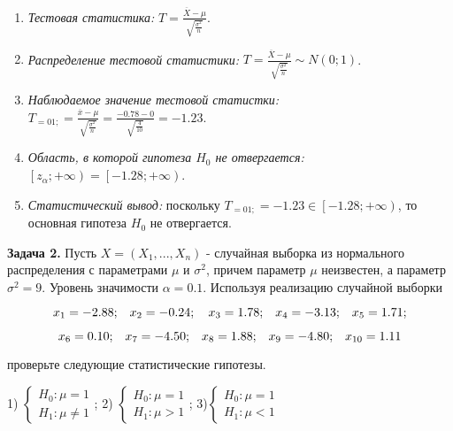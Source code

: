 \begin{enumerate}
\item  \textit{Тестовая статистика:} $T=\frac{\overline{X}-\mu }{\sqrt{{\tfrac{\sigma ^{2} }{n}} } } $.

\item  \textit{Распределение тестовой статистики:} $T=\frac{\overline{X}-\mu }{\sqrt{{\tfrac{\sigma ^{2} }{n}} } } \sim N\left(0;1\right)$.

\item  \textit{Наблюдаемое значение тестовой статистки:} $T_{=01;} =\frac{\overline{x}-\mu }{\sqrt{{\tfrac{\sigma ^{2} }{n}} } } =\frac{-0.78-0}{\sqrt{{\tfrac{4}{10}} } } =-1.23$.

\item  \textit{Область, в которой гипотеза $H_{0} $ не отвергается:} $\left[z_{\alpha } ;+\infty \right)=\left[-1.28;+\infty \right)$.

\item  \textit{Статистический вывод:} поскольку $T_{=01;} =-1.23\in \left[-1.28;+\infty \right)$, то основная гипотеза $H_{0} $ не отвергается.
\end{enumerate}



\textbf{Задача 2. }Пусть $X=\left(X_{1} ,...,X_{n} \right)$ - случайная выборка из нормального распределения с параметрами $\mu $ и $\sigma ^{2} $, причем параметр $\mu $ неизвестен, а параметр $\sigma ^{2} =9$. Уровень значимости $\alpha =0.1$. Используя реализацию случайной выборки 

\[x_{1} =-{\rm 2.88;}\quad x_{2} =-0.{\rm 24};\quad x_{3} ={\rm 1.78;}\quad x_{4} =-{\rm 3.13;}\quad x_{5} ={\rm 1.71;}\] 

\[x_{6} =0.{\rm 1}0{\rm ;}\quad x_{7} =-{\rm 4.5}0{\rm ;}\quad x_{8} ={\rm 1.88;}\quad x_{9} =-{\rm 4.8}0{\rm ;}\quad x_{10} ={\rm 1.11}\] 

проверьте следующие статистические гипотезы.

1) $\left\{\begin{array}{l} {H_{0} :\mu =1} \\ {H_{1} :\mu \ne 1} \end{array}\right. $;             2) $\left\{\begin{array}{l} {H_{0} :\mu =1} \\ {H_{1} :\mu >1} \end{array}\right. $;             3)$\left\{\begin{array}{l} {H_{0} :\mu =1} \\ {H_{1} :\mu <1} \end{array}\right. $



